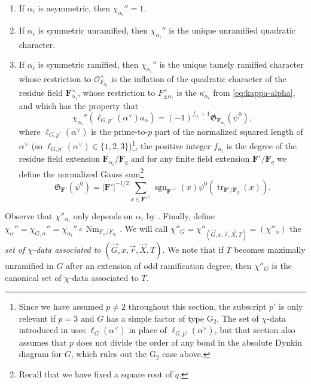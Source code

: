 \documentclass[reqno]{amsart}
\numberwithin{equation}{subsection}
\newcommand{\F}{\mathbf{F}}
\newcommand{\tr}[0]{\operatorname{tr}}
\newcommand{\sgn}{\operatorname{sgn}}
\newcommand{\Gal}{\operatorname{Gal}}
\newcommand\cO{\mathcal{O}}
\newcommand\frG{\mathfrak{G}}
\DeclareMathOperator{\Nm}{Nm}
\theoremstyle{remark}
\numberwithin{equation}{subsection}
\numberwithin{figure}{subsection}
\begin{document}
\begin{enumerate}
\item If $\alpha_i$ is asymmetric, then $\chi_{\alpha_i}'' = 1$.
\item If $\alpha_i$ is symmetric unramified, then $\chi_{\alpha_i}''$ is the unique unramified quadratic character.
\item If $\alpha_i$ is symmetric ramified, then $\chi_{\alpha_i}''$ is the unique tamely ramified character whose restriction to $\cO_{F_{\alpha_i}}^\times$ is the inflation of the quadratic character of the residue field $\F_{\alpha_i}^\times$, whose restriction to $F_{\pm\alpha_i}^\times$ is the $\kappa_{\alpha_i}$ from \eqref{eq:kappa-alpha}, and which has the property that
\begin{equation}\label{eqn:ramified-symmetric-chi-data}
\chi_{\alpha_i}''(\ell_{G,p'}(\alpha^\vee)a_\alpha) = (-1)^{f_{\alpha_i} + 1}\frG_{\F_{\alpha_i}}(\psi^0),
\end{equation}
where $\ell_{G,p'}(\alpha^\vee)$ is the prime-to-$p$ part of the normalized squared length of $\alpha^\vee$ (so $\ell_{G,p'}(\alpha^\vee) \in \{1, 2, 3\}$)\footnote{Since we have assumed $p\neq 2$ throughout this section, the subscript $p'$ is only relevant if $p = 3$ and $G$ has a simple factor of type $\mathrm{G}_2$. The set of $\chi$-data introduced in \cite[\S 4.2]{FKS23} uses $\ell_G(\alpha^\vee)$ in place of $\ell_{G,p'}(\alpha^\vee)$, but that section also assumes that $p$ does not divide the order of any bond in the absolute Dynkin diagram for $G$, which rules out the $\mathrm{G}_2$ case above.}, the positive integer $f_{\alpha_i}$ is the degree of the residue field extension $\F_{\alpha_i}/\F_q$ and for any finite field extension $\F'/\F_q$ we define the normalized Gauss sum\footnote{Recall that we have fixed a square root of $q$.}
\[
\frG_{\F'}(\psi^0) = |\F'|^{-1/2}\sum_{x \in \F'^\times} \sgn_{\F'^\times}(x)\psi^0(\tr_{\F'/\F_q}(x)).
\]
\end{enumerate}
Observe that $\chi''_{\alpha_i}$ only depends on $\alpha_i$ by \cite[Notation 4.2.2]{FKS23}. Finally, define $\chi_\alpha'' = \chi_{G,\alpha}'' = \chi_{\alpha_i}'' \circ \Nm_{F_\alpha/F_{\alpha_i}}$. We will call $\chi''_G = \chi''_{(\vec{G}, x, \vec{r}, \vec{X}, T)} = (\chi''_\alpha)$ the \textit{set of $\chi$-data associated to $(\vec{G}, x, \vec{r}, \vec{X}, T)$}. We note that if $T$ becomes maximally unramified in $G$ after an extension of odd ramification degree, then $\chi''_G$ is the canonical set of $\chi$-data associated to $T$.
\end{document}
